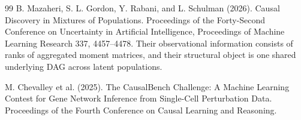 \documentclass{article}
\begin{document}
\begin{thebibliography}{99}
   B. Mazaheri, S. L. Gordon, Y. Rabani, and L. Schulman (2026). Causal Discovery in Mixtures of Populations. Proceedings of the Forty-Second Conference on Uncertainty in Artificial Intelligence, Proceedings of Machine Learning Research 337, 4457--4478. Their observational information consists of ranks of aggregated moment matrices, and their structural object is one shared underlying DAG across latent populations.

   M. Chevalley et al. (2025). The CausalBench Challenge: A Machine Learning Contest for Gene Network Inference from Single-Cell Perturbation Data. Proceedings of the Fourth Conference on Causal Learning and Reasoning.

\end{thebibliography}
\end{document}
